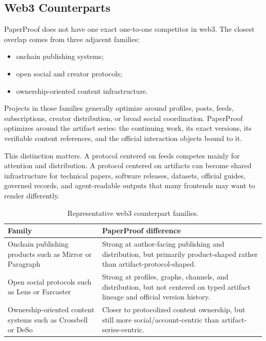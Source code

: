 \documentclass[11pt]{article}
\begin{document}
\subsection{Web3 Counterparts}

PaperProof does not have one exact one-to-one competitor in web3. The closest
overlap comes from three adjacent families:

\begin{itemize}[leftmargin=*]
  \item onchain publishing systems;
  \item open social and creator protocols;
  \item ownership-oriented content infrastructure.
\end{itemize}

Projects in those families generally optimize around profiles, posts, feeds,
subscriptions, creator distribution, or broad social coordination. PaperProof
optimizes around the artifact series: the continuing work, its exact versions,
its verifiable content references, and the official interaction objects bound
to it.

This distinction matters. A protocol centered on feeds competes mainly for
attention and distribution. A protocol centered on artifacts can become shared
infrastructure for technical papers, software releases, datasets, official
guides, governed records, and agent-readable outputs that many frontends may
want to render differently.

\begin{table}[htbp]
\centering
\caption{Representative web3 counterpart families.}
\begin{tabularx}{\textwidth}{p{}X}
\toprule
\textbf{Family} & \textbf{PaperProof difference} \\
\midrule
Onchain publishing products such as Mirror or Paragraph & Strong at author-facing publishing and distribution, but primarily product-shaped rather than artifact-protocol-shaped. \\
Open social protocols such as Lens or Farcaster & Strong at profiles, graphs, channels, and distribution, but not centered on typed artifact lineage and official version history. \\
Ownership-oriented content systems such as Crossbell or DeSo & Closer to protocolized content ownership, but still more social/account-centric than artifact-series-centric. \\
\bottomrule
\end{tabularx}
\end{table}
\end{document}

